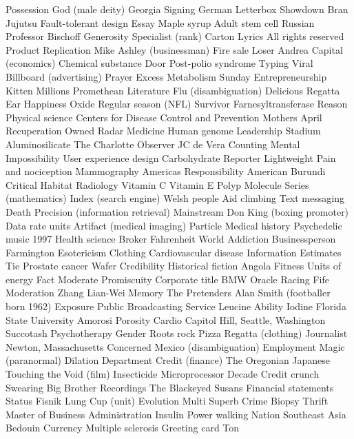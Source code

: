 Possession  God (male deity)  Georgia  
Signing  German  Letterbox  
Showdown  Bran  Jujutsu  
Fault-tolerant design  Essay  Maple syrup  
Adult stem cell  Russian  Professor  
Bischoff  Generosity  Specialist (rank)  
Carton  Lyrics  All rights reserved  
Product  Replication  Mike Ashley (businessman)  
Fire sale  Loser  Andrea  
Capital (economics)  Chemical substance  Door  
Post-polio syndrome  Typing  Viral  
Billboard (advertising)  Prayer  Excess  
Metabolism  Sunday  Entrepreneurship  
Kitten  Millions  Promethean  
Literature  Flu (disambiguation)  Delicious  
Regatta  Ear  Happiness  
Oxide  Regular season (NFL)  Survivor  
Farnesyltransferase  Reason  Physical science  
Centers for Disease Control and Prevention  Mothers  April  
Recuperation  Owned  Radar  
Medicine  Human genome  Leadership  
Stadium  Aluminosilicate  The Charlotte Observer  
JC de Vera  Counting  Mental  
Impossibility  User experience design  Carbohydrate  
Reporter  Lightweight  Pain and nociception  
Mammography  Americas  Responsibility  
American  Burundi  Critical  
Habitat  Radiology  Vitamin C  
Vitamin E  Polyp  Molecule  
Series (mathematics)  Index (search engine)  Welsh people  
Aid climbing  Text messaging  Death  
Precision (information retrieval)  Mainstream  Don King (boxing promoter)  
Data rate units  Artifact (medical imaging)  Particle  
Medical history  Psychedelic music  1997  
Health science  Broker  Fahrenheit  
World  Addiction  Businessperson  
Farmington  Esotericism  Clothing  
Cardiovascular disease  Information  Estimates  
Tie  Prostate cancer  Wafer  
Credibility  Historical fiction  Angola  
Fitness  Units of energy  Fact  
Moderate  Promiscuity  Corporate title  
BMW Oracle Racing  Fife  Moderation  
Zhang Lian-Wei  Memory  The Pretenders  
Alan Smith (footballer born 1962)  Exposure  Public Broadcasting Service  
Leucine  Ability  Iodine  
Florida State University  Amorosi  Porosity  
Cardio  Capitol Hill, Seattle, Washington  Succotash  
Psychotherapy  Gender  Roots rock  
Pizza  Regatta (clothing)  Journalist  
Newton, Massachusetts  Concerned  Mexico (disambiguation)  
Employment  Magic (paranormal)  Dilation  
Department  Credit (finance)  The Oregonian  
Japanese  Touching the Void (film)  Insecticide  
Microprocessor  Decade  Credit crunch  
Swearing  Big Brother Recordings  The Blackeyed Susans  
Financial statements  Status  Fisnik  
Lung  Cup (unit)  Evolution  
Multi  Superb  Crime  
Biopsy  Thrift  Master of Business Administration  
Insulin  Power walking  Nation  
Southeast Asia  Bedouin  Currency  
Multiple sclerosis  Greeting card  Ton  
